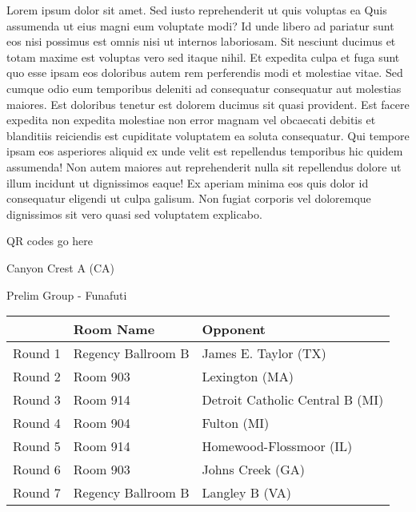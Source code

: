 \documentclass{article}%
\begin{document}
\vspace*{8pt}%
\linebreak%
\newline%
\newline%
Lorem ipsum dolor sit amet. Sed iusto reprehenderit ut quis voluptas ea Quis assumenda ut eius magni eum voluptate modi? Id unde libero ad pariatur sunt eos nisi possimus est omnis nisi ut internos laboriosam. Sit nesciunt ducimus et totam maxime est voluptas vero sed itaque nihil. Et expedita culpa et fuga sunt quo esse ipsam eos doloribus autem rem perferendis modi et molestiae vitae.\newline%
\newline%
Sed cumque odio eum temporibus deleniti ad consequatur consequatur aut molestias maiores. Est doloribus tenetur est dolorem ducimus sit quasi provident. Est facere expedita non expedita molestiae non error magnam vel obcaecati debitis et blanditiis reiciendis est cupiditate voluptatem ea soluta consequatur. Qui tempore ipsam eos asperiores aliquid ex unde velit est repellendus temporibus hic quidem assumenda!\newline%
\newline%
Non autem maiores aut reprehenderit nulla sit repellendus dolore ut illum incidunt ut dignissimos eaque! Ex aperiam minima eos quis dolor id consequatur eligendi ut culpa galisum. Non fugiat corporis vel doloremque dignissimos sit vero quasi sed voluptatem explicabo.\newline%
\newline%
%
\vspace*{30pt}%
\begin{center}%
\begin{Huge}%
QR codes go here%
\end{Huge}%
\end{center}%
\newpage%
%
\begin{center}%
\begin{Huge}%
Canyon Crest A (CA)%
\end{Huge}%
\vspace*{8pt}%
\linebreak%
\begin{Large}%
Prelim Group {-} Funafuti%
\end{Large}%
\end{center}%
\begin{tabularx}{\textwidth}{|c|Y|Y|}%
\hline%
&Room Name&Opponent\\%
\hline%
Round 1&Regency Ballroom B&James E. Taylor (TX)\\%
Round 2&Room 903&Lexington (MA)\\%
Round 3&Room 914&Detroit Catholic Central B (MI)\\%
Round 4&Room 904&Fulton (MI)\\%
Round 5&Room 914&Homewood{-}Flossmoor (IL)\\%
Round 6&Room 903&Johns Creek (GA)\\%
Round 7&Regency Ballroom B&Langley B (VA)\\%
\hline%
\end{tabularx}%
\end{document}
